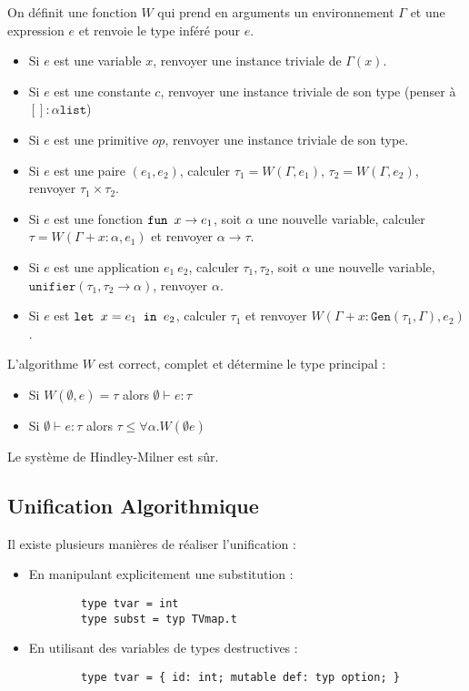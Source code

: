 \documentclass{cours}
\begin{document}
On définit une fonction $W$ qui prend en arguments un environnement $\Gamma$ et une expression $e$ et renvoie le type inféré pour $e$.
\begin{itemize}
    \item Si $e$ est une variable $x$, renvoyer une instance triviale de $\Gamma(x)$.
    \item Si $e$ est une constante $c$, renvoyer une instance triviale de son type (penser à $\left[\right] : \alpha \texttt{list}$)
    \item Si $e$ est une primitive $op$, renvoyer une instance triviale de son type.
    \item Si $e$ est une paire $(e_{1}, e_{2})$, calculer $\tau_{1} = W(\Gamma, e_{1})$, $\tau_{2} = W\left(\Gamma, e_{2}\right)$, renvoyer $\tau_{1} \times \tau_{2}$.
    \item Si $e$ est une fonction $\texttt{fun } x \rightarrow e_{1}$, soit $\alpha$ une nouvelle variable, calculer $\tau = W(\Gamma + x : \alpha, e_{1})$ et renvoyer $\alpha \rightarrow \tau$.
    \item Si $e$ est une application $e_{1} \ e_{2}$, calculer $\tau_{1}, \tau_{2}$, soit $\alpha$ une nouvelle variable,  $\texttt{unifier}(\tau_{1}, \tau_{2} \rightarrow \alpha)$, renvoyer $\alpha$.
    \item Si $e$ est $\texttt{let } x = e_{1} \texttt{ in } e_{2}$, calculer $\tau_{1}$ et renvoyer $W(\Gamma + x : \texttt{Gen}(\tau_{1}, \Gamma), e_{2})$.
\end{itemize}

\begin{theorem}
    L'algorithme $W$ est correct, complet et détermine le type principal :
    \begin{itemize}
        \item Si $W(\emptyset, e) = \tau$ alors $\emptyset \vdash e : \tau$
        \item Si $\emptyset \vdash e : \tau$ alors $\tau \leq \forall \alpha.W(\emptyset e)$
    \end{itemize}
\end{theorem}

\begin{theorem}
    Le système de Hindley-Milner est sûr.
\end{theorem}

\subsection{Unification Algorithmique}
Il existe plusieurs manières de réaliser l'unification : 
\begin{itemize}
    \item En manipulant explicitement une substitution : 
    \begin{verbatim}
        type tvar = int
        type subst = typ TVmap.t
    \end{verbatim}
    \item En utilisant des variables de types destructives : 
    \begin{verbatim}
        type tvar = { id: int; mutable def: typ option; }
    \end{verbatim}
\end{itemize}
\end{document}
